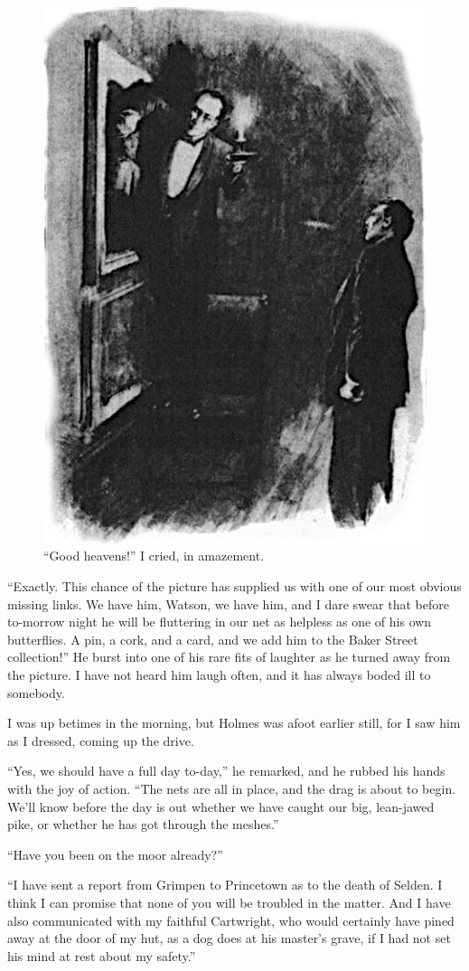 \documentclass[paper=a5,BCOR=7mm,twoside,DIV=calc,12pt,usegeometry,openany,chapterprefix,endperiod,headings=big]{scrbook} %
\begin{document}
\begin{figure}[tbh]
\centering
\includegraphics[width=.6\linewidth]{13_mirror}
\caption{\enquote{Good heavens!} I cried, in amazement.}
\end{figure}

\enquote{Exactly. This chance of the picture has supplied us with one of our most obvious missing links. We have him, Watson, we have him, and I dare swear that before to-morrow night he will be fluttering in our net as helpless as one of his own butterflies. A pin, a cork, and a card, and we add him to the Baker Street collection!} He burst into one of his rare fits of laughter as he turned away from the picture. I have not heard him laugh often, and it has always boded ill to somebody.

I was up betimes in the morning, but Holmes was afoot earlier still, for I saw him as I dressed, coming up the drive.

\enquote{Yes, we should have a full day to-day,} he remarked, and he rubbed his hands with the joy of action. \enquote{The nets are all in place, and the drag is about to begin. We'll know before the day is out whether we have caught our big, lean-jawed pike, or whether he has got through the meshes.}

\enquote{Have you been on the moor already?}

\enquote{I have sent a report from Grimpen to Princetown as to the death of Selden. I think I can promise that none of you will be troubled in the matter. And I have also communicated with my faithful Cartwright, who would certainly have pined away at the door of my hut, as a dog does at his master's grave, if I had not set his mind at rest about my safety.}
\end{document}
